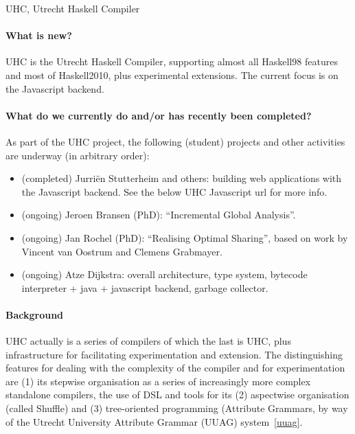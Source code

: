 \begin{hcarentry}{UHC, Utrecht Haskell Compiler}
\label{uhc}
\label{ehc}
\makeheader

\paragraph{What is new?}
UHC is the Utrecht Haskell Compiler, supporting almost all Haskell98 features and most of Haskell2010, plus
experimental extensions.
The current focus is on the Javascript backend.

\paragraph{What do we currently do and/or has recently been completed?}
As part of the UHC project, the following (student) projects and other activities are underway (in arbitrary order):
\begin{itemize}
\item (completed) Jurri\"en Stutterheim and others: building web applications with the Javascript backend.
 See the below UHC Javascript url for more info.
\item (ongoing) Jeroen Bransen (PhD): ``Incremental Global Analysis''.
\item (ongoing) Jan Rochel (PhD): ``Realising Optimal Sharing'', based on work by Vincent van Oostrum and Clemens Grabmayer.
\item (ongoing) Atze Dijkstra: overall architecture, type system, bytecode interpreter + java + javascript backend, garbage collector.
\end{itemize}

\paragraph{Background}

UHC actually is a series of compilers of which the last is UHC, plus
infrastructure for facilitating experimentation and extension.
The distinguishing features for dealing with the complexity of the compiler and for experimentation are
(1) its stepwise organisation as a series of increasingly more complex standalone compilers,
the use of DSL and tools for its (2) aspectwise organisation (called Shuffle) and
(3) tree-oriented programming (Attribute Grammars, by way of the
Utrecht University Attribute Grammar (UUAG) system~\cref{uuag}.
%


\end{hcarentry}
